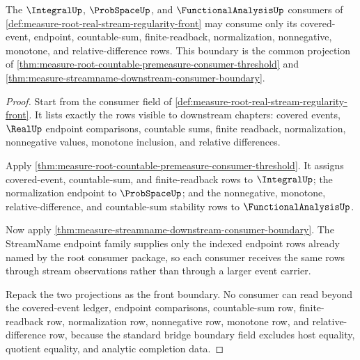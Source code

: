 \begin{theorem}
\label{thm:measure-root-real-stream-consumer-regularity-boundary}
The $\IntegralUp$, $\ProbSpaceUp$, and $\FunctionalAnalysisUp$ consumers of
\autoref{def:measure-root-real-stream-regularity-front} may consume only its
covered-event, endpoint, countable-sum, finite-readback, normalization,
nonnegative, monotone, and relative-difference rows. This boundary is the
common projection of
\autoref{thm:measure-root-countable-premeasure-consumer-threshold} and
\autoref{thm:measure-streamname-downstream-consumer-boundary}.
\end{theorem}
\begin{proof}
Start from the consumer field of
\autoref{def:measure-root-real-stream-regularity-front}. It lists exactly the
rows visible to downstream chapters: covered events, $\RealUp$ endpoint
comparisons, countable sums, finite readback, normalization, nonnegative
values, monotone inclusion, and relative differences.

Apply
\autoref{thm:measure-root-countable-premeasure-consumer-threshold}. It assigns
covered-event, countable-sum, and finite-readback rows to $\IntegralUp$; the
normalization endpoint to $\ProbSpaceUp$; and the nonnegative, monotone,
relative-difference, and countable-sum stability rows to
$\FunctionalAnalysisUp$.

Now apply \autoref{thm:measure-streamname-downstream-consumer-boundary}. The
StreamName endpoint family supplies only the indexed endpoint rows already
named by the root consumer package, so each consumer receives the same rows
through stream observations rather than through a larger event carrier.

Repack the two projections as the front boundary. No consumer can read beyond
the covered-event ledger, endpoint comparisons, countable-sum row,
finite-readback row, normalization row, nonnegative row, monotone row, and
relative-difference row, because the standard bridge boundary field excludes
host equality, quotient equality, and analytic completion data.
\end{proof}

